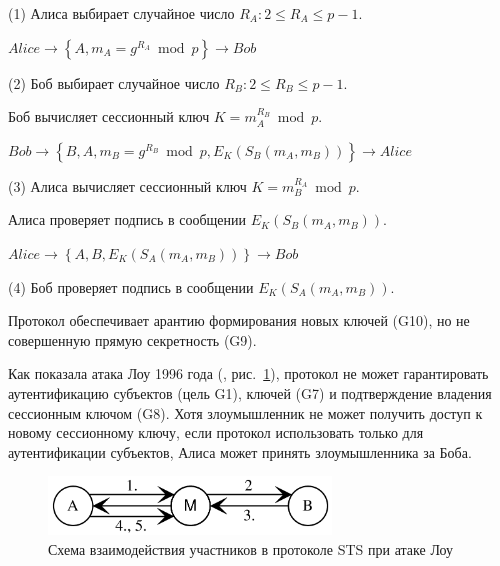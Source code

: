 \begin{protocol}
    \item[(1)] Алиса выбирает случайное число $R_A: 2 \leq R_A \leq p-1$.
    \item[{}] $Alice \to \left\{ A, m_A = g^{R_A} \bmod p \right\} \to Bob$

    \item[(2)] Боб выбирает случайное число $R_B: 2 \leq R_B \leq p-1$.
    \item[{}] Боб вычисляет сессионный ключ $K = m_A^{R_B} \bmod p$.
    \item[{}] $Bob \to \left\{ B, A, m_B = g^{R_B} \bmod p, E_K( S_B ( m_A, m_B )) \right\} \to Alice$

    \item[(3)] Алиса вычисляет сессионный ключ $K = m_B^{R_A} \bmod p$.
    \item[{}] Алиса проверяет подпись в сообщении $E_K( S_B ( m_A, m_B ))$.
    \item[{}] $Alice \to \left\{ A, B, E_K( S_A ( m_A, m_B ) ) \right\} \to Bob$

    \item[(4)] Боб проверяет подпись в сообщении $E_K( S_A ( m_A, m_B ))$.
\end{protocol}

Протокол обеспечивает арантию формирования новых ключей (G10), но не совершенную прямую секретность (G9).

Как показала атака Лоу 1996 года (\cite{Lowe:1996}, рис.~\ref{fig:key_distribution-sts-attack}), протокол не может гарантировать аутентификацию субъектов (цель G1), ключей (G7) и подтверждение владения сессионным ключом (G8). Хотя злоумышленник не может получить доступ к новому сессионному ключу, если протокол использовать только для аутентификации субъектов, Алиса может принять злоумышленника за Боба.

\begin{figure}
    \centering
    \includegraphics[width=0.67\textwidth]{pic/key_distribution-sts-attack}
    \caption{Схема взаимодействия участников в протоколе STS при атаке Лоу\label{fig:key_distribution-sts-attack}}
\end{figure}

